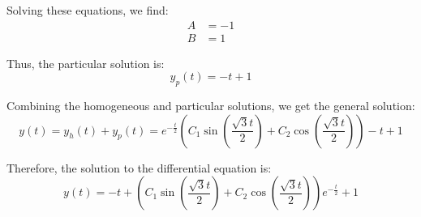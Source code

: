 \documentclass{article}
\begin{document}
Solving these equations, we find:
\begin{align}
A &= -1 \\
B &= 1
\end{align}

Thus, the particular solution is:
\begin{equation}
y_p(t) = -t + 1
\end{equation}

Combining the homogeneous and particular solutions, we get the general solution:
\begin{equation}
y(t) = y_h(t) + y_p(t) = e^{-\frac{t}{2}} \left( C_1 \sin\left(\frac{\sqrt{3}t}{2}\right) + C_2 \cos\left(\frac{\sqrt{3}t}{2}\right) \right) - t + 1
\end{equation}

Therefore, the solution to the differential equation is:
\begin{equation}
y(t) = -t + \left( C_1 \sin\left(\frac{\sqrt{3}t}{2}\right) + C_2 \cos\left(\frac{\sqrt{3}t}{2}\right) \right) e^{-\frac{t}{2}} + 1
\end{equation}
\end{document}
